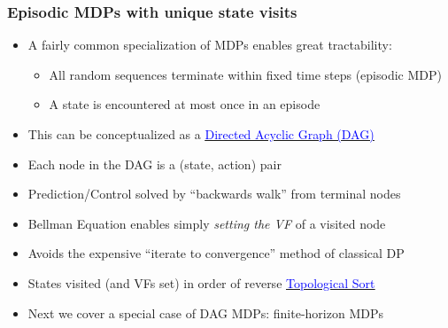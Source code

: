 \documentclass[handout]{beamer}
\begin{document}
\begin{frame}
\frametitle{Episodic MDPs with unique state visits}
\pause
\begin{itemize}[<+->]
\item A fairly common specialization of MDPs enables great tractability:
\begin{itemize}
\item All random sequences terminate within fixed time steps (episodic MDP)
\item A state is encountered at most once in an episode
\end{itemize}
\item This can be conceptualized as a \href{https://en.wikipedia.org/wiki/Directed_acyclic_graph}{\underline{\textcolor{blue}{Directed Acyclic Graph (DAG)}}}
\item Each node in the DAG is a (state, action) pair
\item Prediction/Control solved by ``backwards walk'' from terminal nodes
\item Bellman Equation enables simply {\em setting the VF} of a visited node
\item Avoids the expensive ``iterate to convergence'' method of classical DP
\item States visited (and VFs set) in order of reverse \href{https://en.wikipedia.org/wiki/Topological_sorting}{\underline{\textcolor{blue}{Topological Sort}}}
\item Next we cover a special case of DAG MDPs: finite-horizon MDPs
\end{itemize}
\end{frame}
\end{document}
